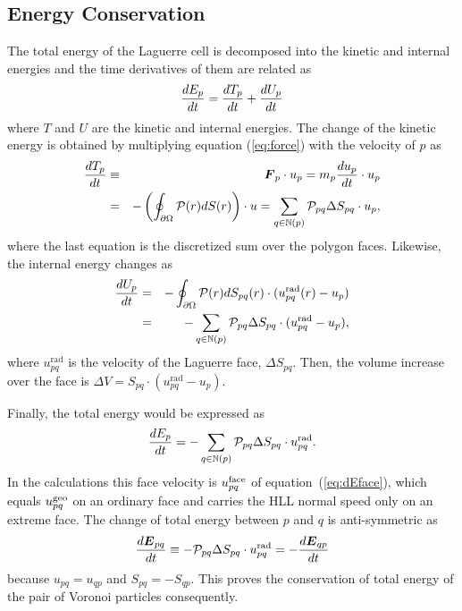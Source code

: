 \documentclass[twocolumn]{aastex63}
\newcommand{\vel}{{u}}
\newcommand{\surf}[0]{S}
\newcommand{\pressure}[0]{\mathcal{P}}
\begin{document}
\subsection{Energy Conservation} 

The total energy of the Laguerre cell is decomposed into the kinetic and internal energies and the time derivatives of them are related as
\begin{equation}
				{dE_p\over dt} = {dT_p\over dt} + {dU_p\over dt}
\end{equation}
where $T$ and $U$ are the kinetic and internal energies. The change of the kinetic energy is obtained by multiplying equation (\ref{eq:force}) with the velocity of  $p$ as
\begin{eqnarray} 
			{dT_p\over dt} &\equiv& \boldsymbol{F}_p\cdot \vel_p= m_p {d\vel_p\over dt} \cdot \vel_p \\ &=&-\left(\oint_{\partial\Omega} \pressure(r) d\surf(r)\right) \cdot u = \sum_{q\in\mathbb{N}(p)} \pressure_{pq}\Delta \surf_{pq}\cdot \vel_p, 
\end{eqnarray}
where the last equation is the discretized sum over the polygon faces.
Likewise, the internal energy changes as
\begin{eqnarray}
				{d U_p \over dt} &=& -\oint_{\partial\Omega} \pressure(r) d \surf_{pq}(r) \cdot ( 
				\vel_{pq}^\textrm{rad}(r) - \vel_p )  \\
				&=& -\sum_{q\in\mathbb{N}(p)} \pressure_{pq} \Delta S_{pq} \cdot (\vel_{pq}^\textrm{rad} - \vel_p ),
\end{eqnarray}
where $\vel_{pq}^\textrm{rad}$ is the velocity of the Laguerre face, $\Delta \surf_{pq}$. Then, the volume increase over the face is $\Delta V = \surf_{pq}\cdot(\vel_{pq}^\textrm{rad}-\vel_p)$.


Finally, the  total energy would be expressed as
\begin{equation}
				{dE_{p}\over dt} = -\sum_{q\in\mathbb{N}(p)} \pressure_{pq}\Delta \surf_{pq}\cdot \vel_{pq}^\textrm{rad}. 
\end{equation}
In the calculations this face velocity is $\vel_{pq}^{\rm face}$ of equation~(\ref{eq:dEface}), which equals $\vel_{pq}^{\rm geo}$ on an ordinary face and carries the HLL normal speed only on an extreme face.
The change of total energy between $p$ and $q$ is anti-symmetric as
\begin{equation}
				{d \boldsymbol{E}_{pq}\over dt} \equiv - \pressure_{pq}\Delta \surf_{pq}\cdot\vel_{pq}^\textrm{rad} = -{d\boldsymbol{E}_{qp}\over dt}
\end{equation}
because $\vel_{pq} = \vel_{qp}$ and $\surf_{pq} = - \surf_{qp}$. This proves the conservation of total energy of the pair of Voronoi particles consequently.
\end{document}
